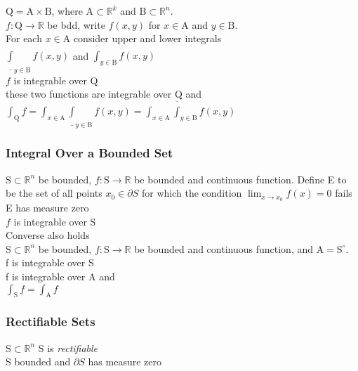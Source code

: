 \LET $\mathrm{Q}=\mathrm{A}\times\mathrm{B}$,
where $\mathrm{A}\subset\mathbb{R}^k$ and
$\mathrm{B}\subset\mathbb{R}^n$.\\
$f:\mathrm{Q}\to\mathbb{R}$ be bdd,
write $f(x,y)$ for $x\in\mathrm{A}$ and 
$y\in\mathrm{B}$.\\
For each $x\in\mathrm{A}$ consider upper and lower integrals\\
$\underline{\int}_{y\in\mathrm{B}}f(x,y)$ and
$\overline{\int}_{y\in\mathrm{B}}f(x,y)$\\
\IF $f$ is integrable over Q\\
\THEN these two functions are integrable over $\mathrm{Q}$ and
$\int_{\mathrm{Q}}f = \int_{x\in\mathrm{A}}\underline{\int}_{y\in\mathrm{B}}f(x,y) =
\int_{x\in\mathrm{A}}\overline{\int}_{y\in\mathrm{B}}f(x,y)$


\subsubsection{Integral Over a Bounded Set}
\LET $\mathrm{S}\subset\mathbb{R}^n$ be bounded, 
$f:\mathrm{S}\to\mathbb{R}$ be bounded and continuous function.
Define E to be the set of all points $x_0\in\partial S$ for which the condition
$\lim_{x\to x_0} f(x) = 0$ fails\\
\IF E has measure zero\\
\THEN $f$ is integrable over S\\
Converse also holds\\

\LET $\mathrm{S}\subset\mathbb{R}^n$ be bounded, 
$f:\mathrm{S}\to\mathbb{R}$ be bounded and continuous function, 
and $\mathrm{A}=\mathrm{S}^{\circ}$.\\
\IF f is integrable over S\\
\THEN f is integrable over A and\\ 
$\int_{\mathrm{S}} f = \int_{\mathrm{A}}f$

\subsubsection{Rectifiable Sets}

\LET $\mathrm{S}\subset\mathbb{R}^n$
\THEN S is \textit{rectifiable} \\
\IFF S bounded and $\partial S$ has measure zero \\

